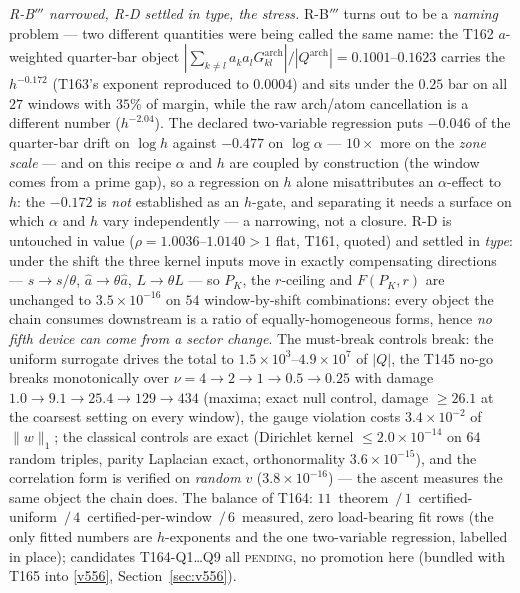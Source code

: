 \documentclass[11pt,a4paper]{article}
\begin{document}
\emph{R-B$'''$ narrowed, R-D settled in type, the stress.} R-B$'''$ turns out
to be a \emph{naming} problem --- two different quantities were being called
the same name: the T162 $a$-weighted quarter-bar object
$|\sum_{k\ne l}a_ka_lG^{\mathrm{arch}}_{kl}|/|Q^{\mathrm{arch}}|
=0.1001$--$0.1623$ carries the $h^{-0.172}$ (T163's exponent reproduced to
$0.0004$) and sits under the $0.25$ bar on all $27$ windows with $35\%$ of
margin, while the raw arch/atom cancellation is a different number
($h^{-2.04}$). The declared two-variable regression puts $-0.046$ of the
quarter-bar drift on $\log h$ against $-0.477$ on $\log\alpha$ ---
$10\times$ more on the \emph{zone scale} --- and on this recipe $\alpha$ and
$h$ are coupled by construction (the window comes from a prime gap), so a
regression on $h$ alone misattributes an $\alpha$-effect to $h$: the
$-0.172$ is \emph{not} established as an $h$-gate, and separating it needs a
surface on which $\alpha$ and $h$ vary independently --- a narrowing, not a
closure. R-D is untouched in value ($\rho=1.0036$--$1.0140>1$ flat, T161,
quoted) and settled in \emph{type}: under the shift the three kernel inputs
move in exactly compensating directions --- $s\to s/\theta$,
$\hat a\to\theta\hat a$, $L\to\theta L$ --- so $P_K$, the $r$-ceiling and
$F(P_K,r)$ are unchanged to $3.5\times10^{-16}$ on $54$ window-by-shift
combinations: every object the chain consumes downstream is a ratio of
equally-homogeneous forms, hence \emph{no fifth device can come from a sector
change}. The must-break controls break: the uniform surrogate drives the
total to $1.5\times10^{3}$--$4.9\times10^{7}$ of $|Q|$, the T145 no-go breaks
monotonically over $\nu=4\to2\to1\to0.5\to0.25$ with damage
$1.0\to9.1\to25.4\to129\to434$ (maxima; exact null control, damage $\ge26.1$
at the coarsest setting on every window), the gauge violation costs
$3.4\times10^{-2}$ of $\|w\|_1$; the classical controls are exact (Dirichlet
kernel $\le2.0\times10^{-14}$ on $64$ random triples, parity Laplacian exact,
orthonormality $3.6\times10^{-15}$), and the correlation form is verified on
\emph{random} $v$ ($3.8\times10^{-16}$) --- the ascent measures the same
object the chain does. The balance of T164:
$11$~theorem~$/\,1$~certified-uniform~$/\,4$~certified-per-window~$/\,
6$~measured, zero load-bearing fit rows (the only fitted numbers are
$h$-exponents and the one two-variable regression, labelled in place);
candidates T164-Q1\ldots Q9 all \textsc{pending}, no promotion here (bundled
with T165 into \vref{v556}, Section~\ref{sec:v556}).
\end{document}
